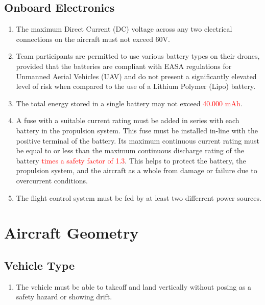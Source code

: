 \documentclass{article}
\begin{document}
\subsection{Onboard Electronics}
\begin{enumerate}
  \item The maximum Direct Current (DC) voltage across any two electrical connections on the aircraft must not exceed 60V.
  \item Team participants are permitted to use various battery types on their drones, provided that the batteries are compliant with EASA regulations for Unmanned Aerial Vehicles (UAV) and do not present a significantly elevated level of risk when compared to the use of a Lithium Polymer (Lipo) battery. 
  \item The total energy stored in a single battery may not exceed \textcolor{red}{40.000 mAh}.
  \item A fuse with a suitable current rating must be added in series with each battery in the propulsion system. 
  This fuse must be installed in-line with the positive terminal of the battery. Its maximum continuous current rating must be equal to or less than the maximum continuous discharge rating of the battery \textcolor{red}{times a safety factor of 1.3}. This helps to protect the battery, the propulsion system, and the aircraft as a whole from damage or failure due to overcurrent conditions.
  \item The flight control system must be fed by at least two differrent power sources. 
\end{enumerate}



\section{Aircraft Geometry}

\subsection{Vehicle Type}
\begin{enumerate}
  \item The vehicle must be able to takeoff and land vertically without posing as a safety hazard or showing drift.  
\end{enumerate}
\end{document}
